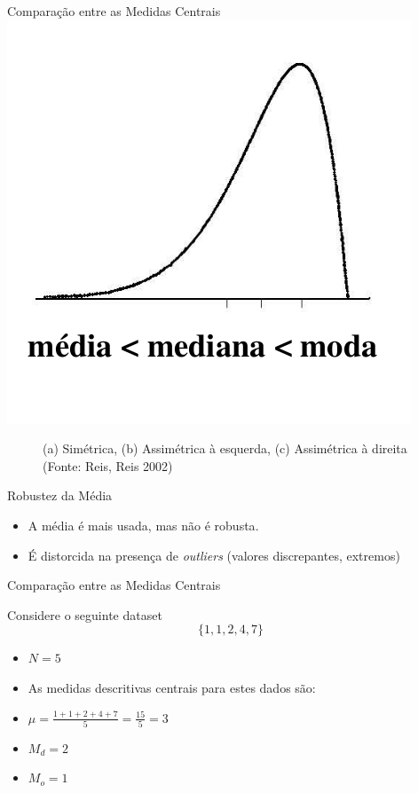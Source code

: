 \documentclass{beamer}
\begin{document}
\begin{frame}{Comparação entre as Medidas Centrais}
    \includegraphics[height=0.4\textheight]{medidas3}
\begin{figure}
  \caption{(a) Simétrica, (b) Assimétrica à esquerda, (c) Assimétrica
    à direita (Fonte: Reis, Reis 2002)}
\end{figure}
\end{frame}

\begin{frame}{Robustez da Média}
  \begin{itemize}
  \item<1> A média é mais usada, mas não é \alert{robusta}.
  \item<1> É distorcida na presença de {\it outliers} (valores
    discrepantes, extremos)
  \end{itemize}
  
\end{frame}
\begin{frame}{Comparação entre as Medidas Centrais}
  \begin{Example}Considere o seguinte dataset $$\{ 1,1,2,4,7\}$$
  \begin{itemize}
  \item $N=5$
  \item As medidas descritivas centrais para estes dados são:
  \item $\mu = \frac{1+1+2+4+7}{5} = \frac{15}{5}= 3$
  \item $M_d = 2$
  \item $M_o = 1$
  \end{itemize}
\end{Example}
\end{frame}
\end{document}
